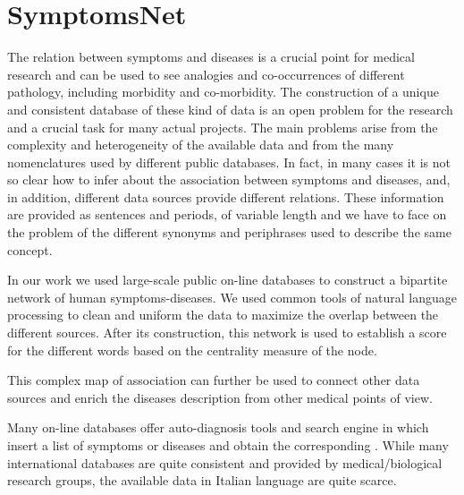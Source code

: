 \documentclass{standalone}
\begin{document}
\section[SymptomsNet]{SymptomsNet}\label{chimera:symptomsnet}

The relation between symptoms and diseases is a crucial point for medical research and can be used to see analogies and co-occurrences of different pathology, including morbidity and co-morbidity.
The construction of a unique and consistent database of these kind of data is an open problem for the research and a crucial task for many actual projects.
The main problems arise from the complexity and heterogeneity of the available data and from the many nomenclatures used by different public databases.
In fact, in many cases it is not so clear how to infer about the association between symptoms and diseases, and, in addition, different data sources provide different relations.
These information are provided as sentences and periods, of variable length and we have to face on the problem of the different synonyms and periphrases used to describe the same concept.

In our work we used large-scale public on-line databases to construct a bipartite network of human symptoms-diseases.
We used common tools of natural language processing to clean and uniform the data to maximize the overlap between the different sources.
After its construction, this network is used to establish a score for the different words based on the centrality measure of the node.

This complex map of association can further be used to connect other data sources and enrich the diseases description from other medical points of view.

Many on-line databases offer auto-diagnosis tools and search engine in which insert a list of symptoms or diseases and obtain the corresponding .
While many international databases are quite consistent and provided by medical/biological research groups, the available data in Italian language are quite scarce.
\end{document}
